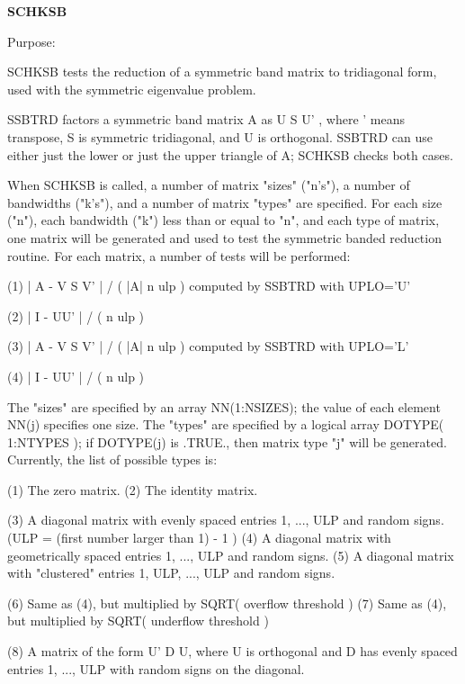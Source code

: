 {\bfseries S\+C\+H\+K\+S\+B} 

\begin{DoxyParagraph}{Purpose\+: }
\begin{DoxyVerb} SCHKSB tests the reduction of a symmetric band matrix to tridiagonal
 form, used with the symmetric eigenvalue problem.

 SSBTRD factors a symmetric band matrix A as  U S U' , where ' means
 transpose, S is symmetric tridiagonal, and U is orthogonal.
 SSBTRD can use either just the lower or just the upper triangle
 of A; SCHKSB checks both cases.

 When SCHKSB is called, a number of matrix "sizes" ("n's"), a number
 of bandwidths ("k's"), and a number of matrix "types" are
 specified.  For each size ("n"), each bandwidth ("k") less than or
 equal to "n", and each type of matrix, one matrix will be generated
 and used to test the symmetric banded reduction routine.  For each
 matrix, a number of tests will be performed:

 (1)     | A - V S V' | / ( |A| n ulp )  computed by SSBTRD with
                                         UPLO='U'

 (2)     | I - UU' | / ( n ulp )

 (3)     | A - V S V' | / ( |A| n ulp )  computed by SSBTRD with
                                         UPLO='L'

 (4)     | I - UU' | / ( n ulp )

 The "sizes" are specified by an array NN(1:NSIZES); the value of
 each element NN(j) specifies one size.
 The "types" are specified by a logical array DOTYPE( 1:NTYPES );
 if DOTYPE(j) is .TRUE., then matrix type "j" will be generated.
 Currently, the list of possible types is:

 (1)  The zero matrix.
 (2)  The identity matrix.

 (3)  A diagonal matrix with evenly spaced entries
      1, ..., ULP  and random signs.
      (ULP = (first number larger than 1) - 1 )
 (4)  A diagonal matrix with geometrically spaced entries
      1, ..., ULP  and random signs.
 (5)  A diagonal matrix with "clustered" entries 1, ULP, ..., ULP
      and random signs.

 (6)  Same as (4), but multiplied by SQRT( overflow threshold )
 (7)  Same as (4), but multiplied by SQRT( underflow threshold )

 (8)  A matrix of the form  U' D U, where U is orthogonal and
      D has evenly spaced entries 1, ..., ULP with random signs
      on the diagonal.


\end{DoxyVerb}
\end{DoxyParagraph}
